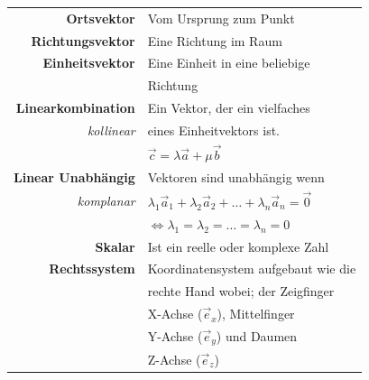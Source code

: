 \begin{tabular}{r|l}
    \textbf{Ortsvektor}         & Vom Ursprung zum Punkt \\
    \textbf{Richtungsvektor}    & Eine Richtung im Raum \\
    \textbf{Einheitsvektor}     & Eine Einheit in eine beliebige \\
                                & Richtung \\
    \textbf{Linearkombination}  & Ein Vektor, der ein vielfaches \\
    \textit{kollinear}          & eines Einheitvektors ist. \\
                                & $\vec{c} = \lambda\vec{a} + \mu \vec{b}$ \\
    \textbf{Linear Unabhängig}  & Vektoren sind unabhängig wenn \\
    \textit{komplanar}         & $\lambda_1 \vec{a}_1 + \lambda_2 \vec{a}_2 + \dots + \lambda_n \vec{a}_n = \vec{0}$ \\
                                & $\Leftrightarrow \lambda_1 = \lambda_2 = \dots = \lambda_n = 0$ \\
    \textbf{Skalar}             & Ist ein reelle oder komplexe Zahl \\
    \textbf{Rechtssystem}       & Koordinatensystem aufgebaut wie die \\
                                & rechte Hand wobei; der Zeigfinger \\
                                & X-Achse ($\vec{e}_x$), Mittelfinger \\
                                & Y-Achse ($\vec{e}_y$) und Daumen \\
                                & Z-Achse ($\vec{e}_z$) \\
\end{tabular}